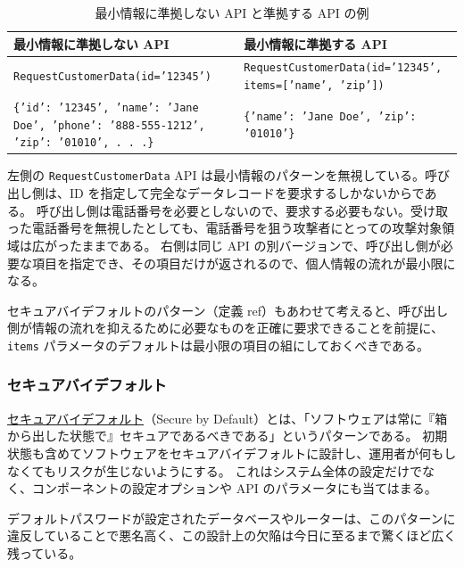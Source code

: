 \documentclass[uplatex]{jsarticle}
\def\ref#1{ref}%
\def\label#1{}%
\begin{document}
\begin{table}[H]
\centering
\caption{最小情報に準拠しない API と準拠する API の例}\label{tab:ch4-least-information-api}
\small
\begin{tabular}{|p{}|p{}|}
\hline
最小情報に準拠しない API & 最小情報に準拠する API \\
\hline
\texttt{RequestCustomerData(id='12345')}
&
\texttt{RequestCustomerData(id='12345', items=['name', 'zip'])} \\
\hline
\texttt{\{'id': '12345', 'name': 'Jane Doe', 'phone': '888-555-1212', 'zip': '01010', . . .\}}
&
\texttt{\{'name': 'Jane Doe', 'zip': '01010'\}} \\
\hline
\end{tabular}
\end{table}

左側の \texttt{RequestCustomerData} API は最小情報のパターンを無視している。呼び出し側は、ID を指定して完全なデータレコードを要求するしかないからである。
呼び出し側は電話番号を必要としないので、要求する必要もない。受け取った電話番号を無視したとしても、電話番号を狙う攻撃者にとっての攻撃対象領域は広がったままである。
右側は同じ API の別バージョンで、呼び出し側が必要な項目を指定でき、その項目だけが返されるので、個人情報の流れが最小限になる。

セキュアバイデフォルトのパターン（定義 \ref{dfn:ch4-secure-by-default}）もあわせて考えると、呼び出し側が情報の流れを抑えるために必要なものを正確に要求できることを前提に、\texttt{items} パラメータのデフォルトは最小限の項目の組にしておくべきである。

\subsubsection{セキュアバイデフォルト}

\begin{dfn}[セキュアバイデフォルト]\label{dfn:ch4-secure-by-default}
\underline{セキュアバイデフォルト}（Secure by Default）とは、「ソフトウェアは常に『箱から出した状態で』セキュアであるべきである」というパターンである。
初期状態も含めてソフトウェアをセキュアバイデフォルトに設計し、運用者が何もしなくてもリスクが生じないようにする。
これはシステム全体の設定だけでなく、コンポーネントの設定オプションや API のパラメータにも当てはまる。
\end{dfn}

デフォルトパスワードが設定されたデータベースやルーターは、このパターンに違反していることで悪名高く、この設計上の欠陥は今日に至るまで驚くほど広く残っている。
\end{document}
